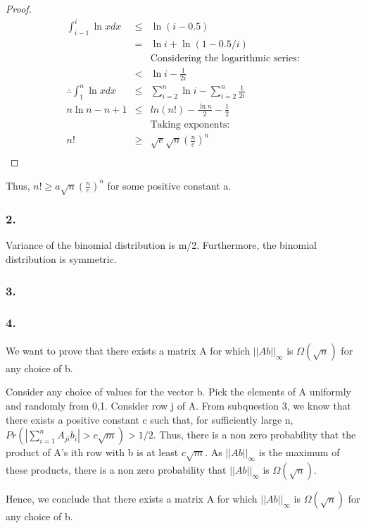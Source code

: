 \documentclass[10pt]{article}
\begin{document}
\begin{proof}
\begin{eqnarray}
\int_{i-1}^{i} \ln x dx &\leq& \ln(i-0.5)\\
&=& \ln i + \ln(1-0.5/i)\\
&& \text{Considering the logarithmic series:}\\
&<& \ln i - \frac{1}{2i}\\
\therefore \int_{1}^{n}\ln x dx &\leq& \sum_{i=2}^{n}\ln i - \sum_{i=2}^{n}\frac{1}{2i}\\
n\ln n -n +1 &\leq& ln(n!) - \frac{\ln n}{2} -\frac{1}{2}\\
&& \text{Taking exponents:}\\
n! &\geq& \sqrt{e}\sqrt{n}(\frac{n}{e})^{n}\\
\end{eqnarray}
\end{proof}

Thus, $n! \geq a \sqrt{n}(\frac{n}{e})^{n}$ for some positive constant a.

\subsubsection{2.}
Variance of the binomial distribution is m/2. Furthermore, the binomial distribution is symmetric.

\subsubsection{3.}


\subsubsection{4.}

We want to prove that there exists a matrix A for which $||Ab||_{\infty}$ is $\Omega(\sqrt{n})$ for any choice of b.

Consider any choice of values for the vector b. Pick the elements of A uniformly and randomly from {0,1}. Consider row j of A. From subquestion 3, we know that there exists a positive constant c such that, for sufficiently large n, $Pr(|\sum_{i=1}^{n}A_{ji}b_{i}|>c\sqrt{m})>1/2$. Thus, there is a non zero probability that the product of A's ith row with b is at least $c\sqrt{m}$. As $||Ab||_{\infty}$ is the maximum of these products, there is a non zero probability that $||Ab||_{\infty}$ is $\Omega(\sqrt{n})$.

Hence, we conclude that there exists a matrix A for which $||Ab||_{\infty}$ is $\Omega(\sqrt{n})$ for any choice of b.




\end{document}
